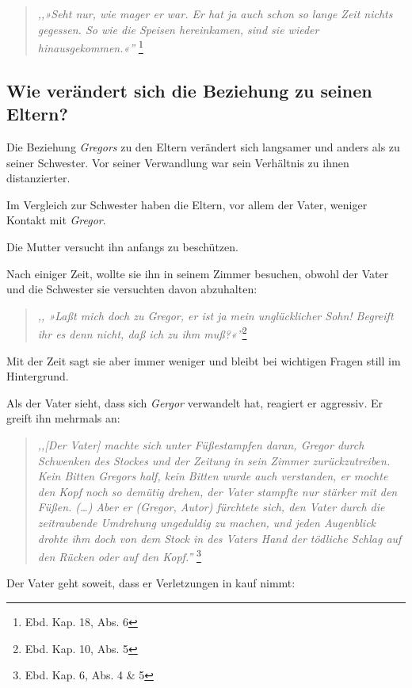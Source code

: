 \documentclass[12pt,a4paper,twoside,titlepage]{article}
\begin{document}
	\begin{quote}
		\textit{,,»Seht nur, wie mager er war. Er hat ja auch schon so lange Zeit nichts gegessen. So wie die Speisen hereinkamen, sind sie wieder hinausgekommen.«''} \footnote{Ebd. Kap. 18, Abs. 6}
	\end{quote}
	
	
	
	\subsection{Wie verändert sich die Beziehung zu seinen Eltern?}

	Die Beziehung \textit{Gregors} zu den Eltern verändert sich langsamer und anders als zu seiner Schwester. Vor seiner Verwandlung war sein Verhältnis zu ihnen distanzierter.
	
	Im Vergleich zur Schwester haben die Eltern, vor allem der Vater, weniger Kontakt mit \textit{Gregor}.
	
	Die Mutter versucht ihn anfangs zu beschützen.
	
	Nach einiger Zeit, wollte sie ihn in seinem Zimmer besuchen, obwohl der Vater und die Schwester sie versuchten davon abzuhalten: 

	\begin{quote}
		\textit{,, »Laßt mich doch zu Gregor, er ist ja mein unglücklicher Sohn! Begreift ihr es denn nicht, daß ich zu ihm muß?«''}\footnote{Ebd. Kap. 10, Abs. 5}
	\end{quote}
	
	Mit der Zeit sagt sie aber immer weniger und bleibt bei wichtigen Fragen still im Hintergrund.
	
	Als der Vater sieht, dass sich \textit{Gergor} verwandelt hat, reagiert er aggressiv. Er greift ihn mehrmals an:
	\begin{quote}
		\textit{,,[Der Vater] machte sich unter Füßestampfen daran, Gregor durch Schwenken des Stockes und der Zeitung in sein Zimmer zurückzutreiben. Kein Bitten Gregors half, kein Bitten wurde auch verstanden, er mochte den Kopf noch so demütig drehen, der Vater stampfte nur stärker mit den Füßen.
		(\dots)
		Aber er (Gregor, Autor) fürchtete sich, den Vater durch die zeitraubende Umdrehung ungeduldig zu machen, und jeden Augenblick drohte ihm doch von dem Stock in des Vaters Hand der tödliche Schlag auf den Rücken oder auf den Kopf.''}
		\footnote{Ebd. Kap. 6, Abs. 4 \& 5}
	\end{quote}
	
	Der Vater geht soweit, dass er Verletzungen in kauf nimmt:
	
\end{document}
